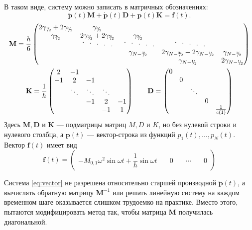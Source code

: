 \documentclass[12pt]{article}
\newcommand{\cutefrac}[2]{{}^{#1\!}\!/{\!}_#2}
\newcommand{\half}{\cutefrac{1}{2}}
\newcommand{\cuteddots}{
\text{
\raisebox{.6ex}{$\cdot$}\hspace{.75em}%
\raisebox{.3ex}{$\cdot$}\hspace{.75em}%
$\cdot$\hspace{.75em}%
\raisebox{-.3ex}{$\cdot$}\hspace{.75em}%
\raisebox{-.6ex}{$\cdot$}%
}}
\begin{document}
В таком виде, систему можно записать в матричных обозначениях:
\begin{equation}
\ddot{\mathbf{p}}(t) \mathbf{M} + \dot{\mathbf{p}}(t) \mathbf{D}
+ \mathbf{p}(t) \mathbf{K} = \mathbf{f}(t).
\label{eq:vector}
\end{equation}
\begin{gather*}
\mathbf{M} = 
\frac{h}{6}
\begin{pmatrix}
2\gamma_{\half} + 2\gamma_{\cutefrac{3}{2}} & \gamma_{\cutefrac{3}{2}}\\
\gamma_{\cutefrac{3}{2}} & 2\gamma_{\cutefrac{3}{2}} + 2\gamma_{\cutefrac{5}{2}} & \gamma_{\cutefrac{5}{2}}\\
& \cuteddots\; & \cuteddots & \;\cuteddots \\
& & \gamma_{N - \cutefrac{3}{2}} & 2\gamma_{N - \cutefrac{3}{2}} + 2\gamma_{N
- \half} & \gamma_{N-\half}\\
& & & \gamma_{N - \half} & 2\gamma_{N-\half}
\end{pmatrix}
\\
\mathbf{K} = 
\frac{1}{h}
\begin{pmatrix}
2 & -1\\
-1 & 2 & -1\\
& \ddots & \ddots & \ddots \\
& & -1 & 2 & -1\\
& & & -1 & 1
\end{pmatrix}\qquad
\mathbf{D} = 
\begin{pmatrix}
0  \\
& 0 \\
& & \ddots \\
& & & 0 \\
& & & & \frac{1}{c(1)}
\end{pmatrix}
\end{gather*}
Здесь $\mathbf{M}, \mathbf{D}$ и $\mathbf{K}$ --- подматрицы матриц $M, D$ и
$K$, но без нулевой строки и нулевого столбца, а $\mathbf{p}(t)$ --- вектор-строка из 
функций $p_1(t), \dots, p_N(t)$. Вектор $\mathbf{f}(t)$ имеет вид
\[
\mathbf{f}(t) = 
\begin{pmatrix}
-M_{0,1}\omega^2 \sin \omega t + \dfrac{1}{h} \sin \omega t & \quad 0 \quad & \cdots & \quad 0
\end{pmatrix}
\]

Система \eqref{eq:vector} не разрешена относительно старшей производной
$\ddot{\mathbf{p}}(t)$, а вычислять обратную матрицу $\mathbf{M}^{-1}$ или
решать линейную систему на каждом временном шаге оказывается слишком трудоемко
на практике. Вместо этого, пытаются модифицировать метод так, чтобы матрица
$\mathbf{M}$ получилась диагональной.
\end{document}
